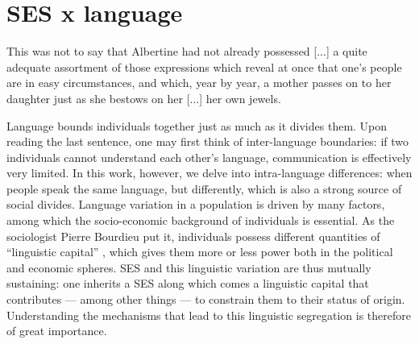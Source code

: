 \documentclass[../thesis.tex]{subfiles}
\begin{document}
\chapter{SES x language}
\label{ch:ses_ling}

\epigraph{
  This was not to say that Albertine had not already possessed [...] a quite
  adequate assortment  of those expressions which reveal at once that one's people are
  in easy circumstances, and which, year by year, a mother passes on to her daughter
  just as she bestows on her [...]
  her own jewels.
}{
}

Language bounds individuals together just as much as it divides them. Upon reading the
last sentence, one may first think of inter-language boundaries: if two individuals
cannot understand each other's language, communication is effectively very limited. In
this work, however, we delve into intra-language differences: when people speak the same
language, but differently, which is also a strong source of social divides. Language
variation in a population is driven by many factors, among which the socio-economic
background of individuals is essential. As the sociologist Pierre Bourdieu put it,
individuals possess different quantities of ``linguistic capital''
\cite{BourdieuLanguageSymbolic2009}, which gives them more or less power both in the
political and economic spheres. \Ac{SES} and this linguistic
variation are thus mutually sustaining: one inherits a \ac{SES} along which comes a
linguistic capital that contributes --- among other things --- to constrain them to
their status of origin. Understanding the mechanisms that lead to this linguistic
segregation is therefore of great importance. 
\end{document}
